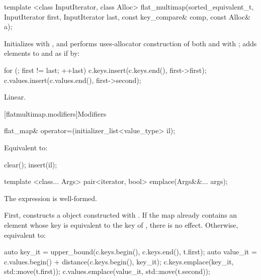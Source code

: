 \begin{codeblock}
\begin{codeblock}
\begin{codeblock}
\begin{addedblock}
%
\begin{itemdecl}
template <class InputIterator, class Alloc>
  flat_multimap(sorted_equivalent_t, InputIterator first, InputIterator last,
                const key_compare& comp, const Alloc& a);
\end{itemdecl}

\begin{itemdescr}
\pnum
\effects Initializes  with , and performs
uses-allocator construction of both
 and  with ; adds elements to
 and  as if by:
\begin{codeblock}
for (; first != last; ++last) {
  c.keys.insert(c.keys.end(), first->first);
  c.values.insert(c.values.end(), first->second);
}
\end{codeblock}

\pnum
\complexity
Linear.
\end{itemdescr}

[flatmultimap.modifiers]{Modifiers}

%
\begin{itemdecl}
flat_map& operator=(initializer_list<value_type> il);
\end{itemdecl}

\begin{itemdescr}

\pnum
\effects Equivalent to:
\begin{codeblock}
clear();
insert(il);
\end{codeblock}
\end{itemdescr}

%
\begin{itemdecl}
template <class... Args> pair<iterator, bool> emplace(Args&&... args);
\end{itemdecl}

\begin{itemdescr}
\pnum
\constraints
The expression  is well-formed.

\pnum
\effects
First, constructs a  object 
constructed with .  If the map already
contains an element whose key is equivalent to the key of , there is
no effect.  Otherwise, equivalent to:
\begin{codeblock}
auto key_it = upper_bound(c.keys.begin(), c.keys.end(), t.first);
auto value_it = c.values.begin() + distance(c.keys.begin(), key_it);
c.keys.emplace(key_it, std::move(t.first));
c.values.emplace(value_it, std::move(t.second));
\end{codeblock}


\end{itemdescr}
\end{addedblock}
\end{codeblock}
\end{codeblock}
\end{codeblock}
